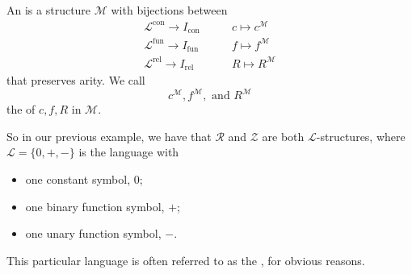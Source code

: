 \documentclass[notoc,notitlepage]{tufte-book}
\DeclareMathOperator{\con}{con}
\DeclareMathOperator{\fun}{fun}
\DeclareMathOperator{\rel}{rel}
\begin{document}
\begin{defn}\label{defn:l_structure}
  An  is a structure $\mathcal{M}$ with bijections between
  \begin{align*}
    \mathcal{L}^{\con} \to I_{\con} \quad & \quad c \mapsto c^\mathcal{M} \\
    \mathcal{L}^{\fun} \to I_{\fun} \quad & \quad f \mapsto f^\mathcal{M} \\
    \mathcal{L}^{\rel} \to I_{\rel} \quad & \quad R \mapsto R^\mathcal{M}
  \end{align*}
  that preserves arity. We call
  \begin{equation*}
    c^{\mathcal{M}}, f^{\mathcal{M}}, \text{ and } R^{\mathcal{M}}
  \end{equation*}
  the  of $c, f, R$ in $\mathcal{M}$.
\end{defn}

So in our previous example, we have that $\mathcal{R}$ and $\mathcal{Z}$ are both $\mathcal{L}$-structures, where $\mathcal{L} = \{ 0, +, - \}$ is the language with
\begin{itemize}
  \item one constant symbol, $0$;
  \item one binary function symbol, $+$;
  \item one unary function symbol, $-$.
\end{itemize}
This particular language is often referred to as the , for obvious reasons.
\end{document}

